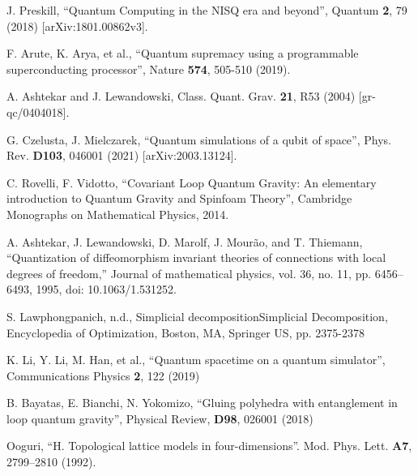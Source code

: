 \documentclass[a4paper,11pt,aps,tightenlines,nofootinbib]{revtex4}
\begin{document}
\vspace{0cm}

\begin{thebibliography}{99}
        J. Preskill,
        ``Quantum Computing in the NISQ era and beyond'',
        Quantum {\bf 2}, 79 (2018)
        [arXiv:1801.00862v3].

        F. Arute, K. Arya, et al.,
        ``Quantum supremacy using a programmable superconducting processor'',
        Nature {\bf 574}, 505-510 (2019).


        A. Ashtekar and J. Lewandowski, Class. Quant. Grav. {\bf 21},
        R53 (2004) [gr-qc/0404018].

        G. Czelusta, J. Mielczarek,
        ``Quantum simulations of a qubit of space'',
        Phys. Rev. {\bf D103}, 046001 (2021)
        [arXiv:2003.13124].


        C. Rovelli, F. Vidotto,
        ``Covariant Loop Quantum Gravity: An elementary introduction to Quantum Gravity and Spinfoam Theory'',
        Cambridge Monographs on Mathematical Physics, 2014.

        A. Ashtekar, J. Lewandowski, D. Marolf, J. Mourão, and T. Thiemann, 
        “Quantization of diffeomorphism invariant theories of connections with local degrees of freedom,” 
        Journal of mathematical physics,
         vol. 36, no. 11, pp. 6456–6493, 1995, doi: 10.1063/1.531252.

        S. Lawphongpanich, n.d., 
        Simplicial decompositionSimplicial Decomposition, 
        Encyclopedia of Optimization, Boston, MA, Springer US, pp. 2375-2378



        K. Li, Y. Li, M. Han, et al.,
        ``Quantum spacetime on a quantum simulator'',
        Communications Physics {\bf 2}, 122 (2019)


        B. Bayatas, E. Bianchi, N. Yokomizo,
        ``Gluing polyhedra with entanglement in loop quantum gravity'',
        Physical Review, {\bf D98}, 026001 (2018)

        Ooguri, ``H. Topological lattice models in four-dimensions''. 
        Mod. Phys. Lett. {\bf A7}, 2799–2810 (1992).


\end{thebibliography}
\end{document}
